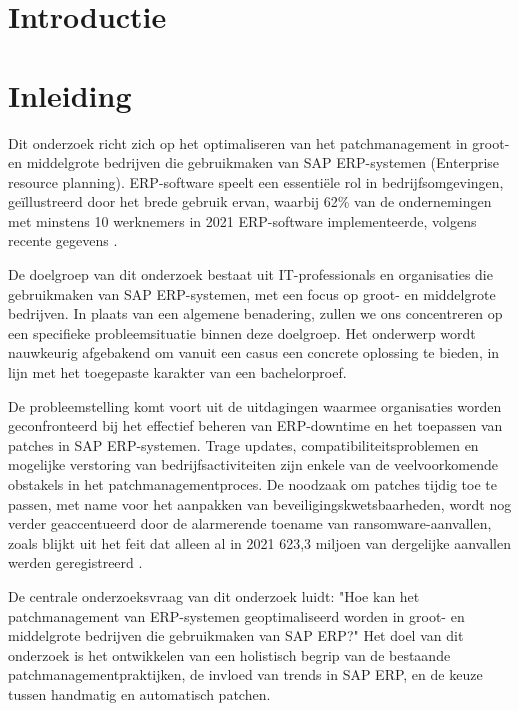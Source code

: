 
\section{Introductie}%
\label{sec:introductie}
\section{Inleiding}

Dit onderzoek richt zich op het optimaliseren van het patchmanagement in groot- en middelgrote bedrijven die gebruikmaken van SAP ERP-systemen (Enterprise resource planning). ERP-software speelt een essentiële rol in bedrijfsomgevingen, geïllustreerd door het brede gebruik ervan, waarbij 62\% van de ondernemingen met minstens 10 werknemers in 2021 ERP-software implementeerde, volgens recente gegevens \autocite{Statistiek Vlaanderen}.

De doelgroep van dit onderzoek bestaat uit IT-professionals en organisaties die gebruikmaken van SAP ERP-systemen, met een focus op groot- en middelgrote bedrijven. In plaats van een algemene benadering, zullen we ons concentreren op een specifieke probleemsituatie binnen deze doelgroep. Het onderwerp wordt nauwkeurig afgebakend om vanuit een casus een concrete oplossing te bieden, in lijn met het toegepaste karakter van een bachelorproef.

De probleemstelling komt voort uit de uitdagingen waarmee organisaties worden geconfronteerd bij het effectief beheren van ERP-downtime en het toepassen van patches in SAP ERP-systemen. Trage updates, compatibiliteitsproblemen en mogelijke verstoring van bedrijfsactiviteiten zijn enkele van de veelvoorkomende obstakels in het patchmanagementproces. De noodzaak om patches tijdig toe te passen, met name voor het aanpakken van beveiligingskwetsbaarheden, wordt nog verder geaccentueerd door de alarmerende toename van ransomware-aanvallen, zoals blijkt uit het feit dat alleen al in 2021 623,3 miljoen van dergelijke aanvallen werden geregistreerd \autocite{Griffiths2022}.

De centrale onderzoeksvraag van dit onderzoek luidt: "Hoe kan het patchmanagement van ERP-systemen geoptimaliseerd worden in groot- en middelgrote bedrijven die gebruikmaken van SAP ERP?" Het doel van dit onderzoek is het ontwikkelen van een holistisch begrip van de bestaande patchmanagementpraktijken, de invloed van trends in SAP ERP, en de keuze tussen handmatig en automatisch patchen. 

